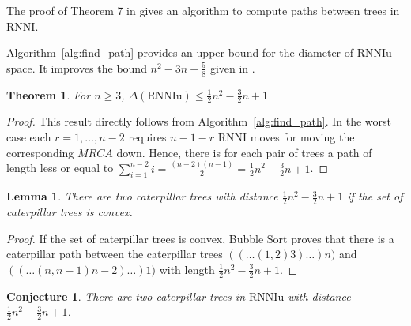 \documentclass[11pt, a4paper]{article}
\newcommand{\rnni}{\mathrm{RNNI}}
\newcommand{\rnniu}{\mathrm{RNNIu}}
\newtheorem{theorem}[definition]{Theorem}
\newtheorem{conjecture}[definition]{Conjecture}
\newtheorem{lemma}[definition]{Lemma}
\begin{document}
The proof of Theorem 7 in \cite{Gavryushkin2017} gives an algorithm to compute paths between trees in $\rnni$.



Algorithm~\ref{alg:find_path} provides an upper bound for the diameter of $\rnniu$ space.
It improves the bound $n^2 - 3n - \frac{5}{8}$ given in \cite{Gavryushkin2017}.

\begin{theorem}
	For $n \geq 3$, $\Delta(\rnniu) \leq \frac{1}{2}n^2-\frac{3}{2}n+1$
\end{theorem}

\begin{proof}
	This result directly follows from Algorithm~\ref{alg:find_path}.
	In the worst case each $r = 1, \dots, n-2$ requires $n-1-r$ $\rnni$ moves for moving the corresponding $MRCA$ down.
	Hence, there is for each pair of trees a path of length less or equal to $\sum\limits_{i = 1}^{n-2} i = \frac{(n-2)(n-1)}{2} = \frac{1}{2}n^2-\frac{3}{2}n+1$.
\end{proof}


\begin{lemma}
	There are two caterpillar trees with distance $\frac{1}{2}n^2-\frac{3}{2}n+1$ if the set of caterpillar trees is convex.
	\label{lemma:caterpillar_diameter_convex}
\end{lemma}

\begin{proof}
	If the set of caterpillar trees is convex, Bubble Sort proves that there is a caterpillar path between the caterpillar trees
	$(( \dots (1,2)3)\dots)n)$ and $(( \dots (n,n-1)n-2)\dots)1)$ with length $\frac{1}{2}n^2-\frac{3}{2}n+1$. 
\end{proof}

\begin{conjecture}
	There are two caterpillar trees in $\rnniu$ with distance $\frac{1}{2}n^2-\frac{3}{2}n+1$.
	\label{conj:caterpillar_diameter}
\end{conjecture}
\end{document}
